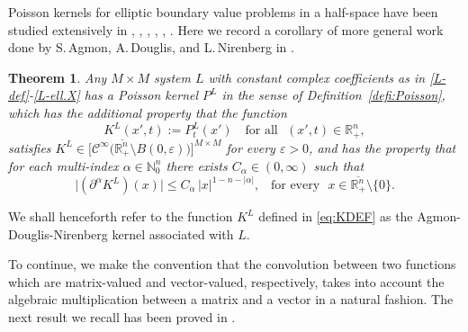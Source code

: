 \documentclass[11pt,reqno]{amsart}
\numberwithin{equation}{section}
\newtheorem{theorem}{Theorem}[section]
\theoremstyle{remark}
\begin{document}
Poisson kernels for elliptic boundary value problems in a half-space have
been studied extensively in \cite{ADNI}, \cite{ADNII}, \cite[\S{10.3}]{KMR2},
\cite{Sol}, \cite{Sol1}, \cite{Sol2}. Here we record a corollary of more general
work done by S.\,Agmon, A.\,Douglis, and L.\,Nirenberg in \cite{ADNII}.

\begin{theorem}\label{ya-T4-fav}
Any $M\times M$ system $L$ with constant complex coefficients as in \eqref{L-def}-\eqref{L-ell.X} has a Poisson
kernel $P^L$ in the sense of Definition~\ref{defi:Poisson}, which has the additional
property that the function
%
\begin{equation}\label{eq:KDEF}
K^L(x',t):=P^L_t(x')\quad\text{for all }\,\,(x',t)\in{\mathbb{R}}^n_{+},
\end{equation}
%
satisfies $K^L\in\big[{\mathscr{C}}^\infty\big(\overline{{\mathbb{R}}^n_{+}}
\setminus B(0,\varepsilon)\big)\big]^{M\times M}$ for every $\varepsilon>0$, 
and has the property that for each multi-index $\alpha\in{\mathbb{N}}_0^n$
there exists $C_\alpha\in(0,\infty)$ such that
%
\begin{equation}\label{eq:KjG}
\big|(\partial^\alpha K^L)(x)\big|\leq C_\alpha\,|x|^{1-n-|\alpha|},\,\,\,\text{ for every }\,\,
x\in{\overline{{\mathbb{R}}^n_{+}}}\setminus\{0\}.
\end{equation}
\end{theorem}

We shall henceforth refer to the function $K^L$ defined in \eqref{eq:KDEF} as
the Agmon-Douglis-Nirenberg kernel associated with $L$.

To continue, we make the convention that the convolution between two functions 
which are matrix-valued and vector-valued, respectively, takes into account the 
algebraic multiplication between a matrix and a vector in a natural fashion.
The next result we recall has been proved in \cite[Theorem~3.1, p.\,934]{MMMM16}.
\end{document}
